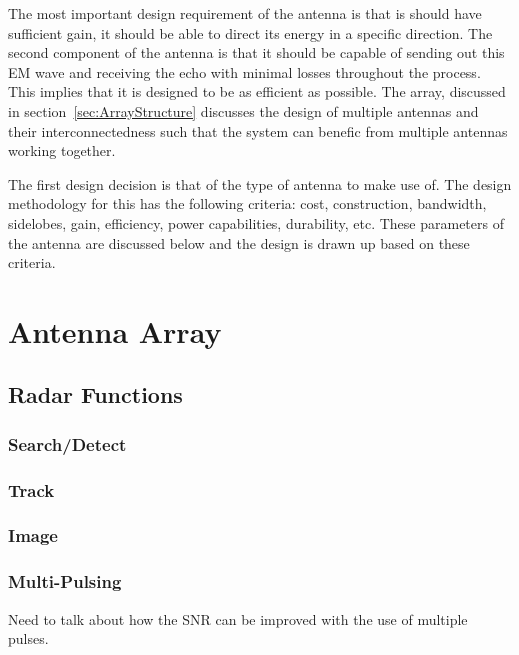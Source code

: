 \documentclass[11pt]{witseiepaper}
\begin{document}
The most important design requirement of the antenna is that is should have sufficient gain, it should be able to direct its energy in a specific direction. The second component of the antenna is that it should be capable of sending out this EM wave and receiving the echo with minimal losses throughout the process. This implies that it is designed to be as efficient as possible.
The array, discussed in section~\ref{sec:ArrayStructure} discusses the design of multiple antennas and their interconnectedness such that the system can benefic from multiple antennas working together.

The first design decision is that of the type of antenna to make use of. The design methodology for this has the following criteria: cost, construction, bandwidth, sidelobes, gain, efficiency, power capabilities, durability, etc. 
These parameters of the antenna are discussed below and the design is drawn up based on these criteria. 



\section{Antenna Array} \label{sec:AntennaArray}



\subsection{Radar Functions} \label{sec:RadarFunctions}

\subsubsection{Search/Detect} \label{sec:SearchDetect}

\subsubsection{Track} \label{sec:Track}

\subsubsection{Image} \label{sec:Image}

\subsubsection{Multi-Pulsing} \label{sec:MultiPulsing}

Need to talk about how the SNR can be improved with the use of multiple pulses.
\end{document}
